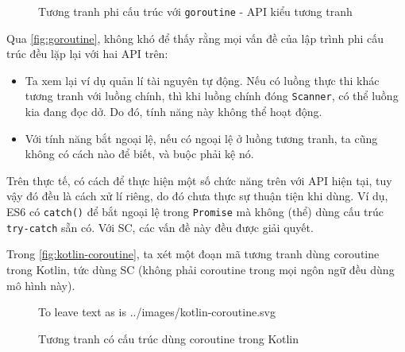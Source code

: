 \documentclass[../../thesis]{subfiles}
\begin{document}
\begin{figure}
    \centering
    
    \vspace*{-10mm}
    \caption{Tương tranh phi cấu trúc với \texttt{goroutine} - API kiểu tương
        tranh \cite{NJS_SC}}
    \label{fig:goroutine}
\end{figure}

Qua \autoref{fig:goroutine}, không khó để thấy rằng mọi vấn đề của lập trình phi
cấu trúc đều lặp lại với hai API trên:

\begin{itemize}
    \item
        Ta xem lại ví dụ quản lí tài nguyên tự động. Nếu có luồng thực thi khác
        tương tranh với luồng chính, thì khi luồng chính đóng \texttt{Scanner},
        có thể luồng kia đang đọc dở. Do đó, tính năng này không thể hoạt động.
\end{itemize}

\begin{itemize}[resume, before = \vspace*{-\dimexpr\topsep+\partopsep\relax}]
    \item
        Với tính năng bắt ngoại lệ, nếu có ngoại lệ ở luồng tương tranh, ta cũng
        không có cách nào để biết, và buộc phải kệ nó.
\end{itemize}

Trên thực tế, có cách để thực hiện một số chức năng trên với API hiện tại, tuy
vậy đó đều là cách xử lí riêng, do đó chưa thực sự thuận tiện khi dùng. Ví dụ,
ES6 có \texttt{catch()} để bắt ngoại lệ trong \texttt{Promise} mà không (thể)
dùng cấu trúc \texttt{try-catch} sẵn có. Với SC, các vấn đề này đều được giải
quyết.

Trong \autoref{fig:kotlin-coroutine}, ta xét một đoạn mã tương tranh dùng
coroutine trong Kotlin, tức dùng SC (không phải coroutine trong mọi ngôn ngữ đều
dùng mô hình này).

\begin{figure}
    \centering
    \vspace*{-4mm}
     To leave text as is
        {../images/kotlin-coroutine.svg}                 %
    \vspace*{-10mm}
    \caption{Tương tranh có cấu trúc dùng coroutine trong Kotlin \cite{NJS_SC}}
    \label{fig:kotlin-coroutine}
\end{figure}
\end{document}
